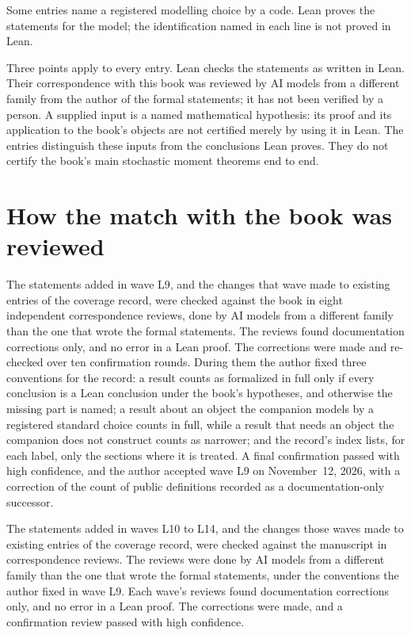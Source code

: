 \ifdefined\lcModelKey
Some entries name a registered modelling choice by a code. Lean proves the
statements for the model; the identification named in each line is not
proved in Lean.
\begin{description}\setlength{\itemsep}{0pt}
  \lcModelKey
\end{description}
\fi

Three points apply to every entry. Lean checks the statements as written
in Lean. Their correspondence with this book was reviewed by AI models
from a different family from the author of the formal statements; it has
not been verified by a person. A supplied input is a named mathematical
hypothesis: its proof and its application to the book's objects are not
certified merely by using it in Lean. The entries distinguish these inputs
from the conclusions Lean proves. They do not certify the book's main
stochastic moment theorems end to end.

\section{How the match with the book was reviewed}\label{S:lean-match-review}

The statements added in wave L9, and the changes that wave made to existing
entries of the coverage record, were checked against the book in eight
independent correspondence reviews, done by AI models from a different family
than the one that wrote the formal statements. The reviews found documentation
corrections only, and no error in a Lean proof. The corrections were made and
re-checked over ten confirmation rounds. During them the author fixed three
conventions for the record: a result counts as formalized in full only if every
conclusion is a Lean conclusion under the book's hypotheses, and otherwise the
missing part is named; a result about an object the companion models by a
registered standard choice counts in full, while a result that needs an object
the companion does not construct counts as narrower; and the record's index
lists, for each label, only the sections where it is treated. A final
confirmation passed with high confidence, and the author accepted wave L9 on
November~12, 2026, with a correction of the count of public definitions
recorded as a documentation-only successor.

The statements added in waves L10 to L14, and the changes those waves made to
existing entries of the coverage record, were checked against the manuscript in
correspondence reviews. The reviews were done by AI models from a different
family than the one that wrote the formal statements, under the conventions the
author fixed in wave L9. Each wave's reviews found documentation corrections
only, and no error in a Lean proof. The corrections were made, and a
confirmation review passed with high confidence.

